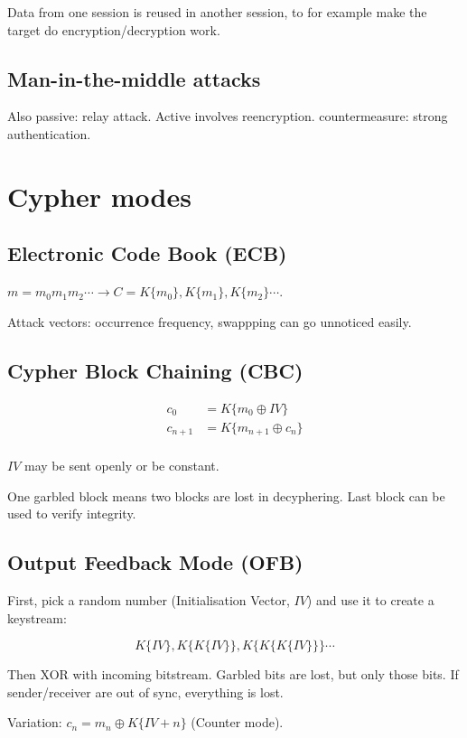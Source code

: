 \documentclass{article}
\begin{document}
Data from one session is reused in another session, to for example make the
target do encryption/decryption work.

\subsection{Man-in-the-middle attacks}

Also passive: relay attack. Active involves reencryption. countermeasure:
strong authentication.

\section{Cypher modes}

\subsection{Electronic Code Book (ECB)}
$m = m_0m_1m_2\cdots \rightarrow C = K\{m_0\},K\{m_1\},K\{m_2\}\cdots$.

Attack vectors: occurrence frequency, swappping can go unnoticed easily.

\subsection{Cypher Block Chaining (CBC)}

\begin{align*}
  c_0     &= K\{m_0 \oplus IV\} \\
  c_{n+1} &= K\{m_{n+1} \oplus c_n\} \\
\end{align*}

$IV$ may be sent openly or be constant.

One garbled block means two blocks are lost in decyphering. Last block
can be used to verify integrity.

\subsection{Output Feedback Mode (OFB)}

First, pick a random number (Initialisation Vector, $IV$) and use it to
create a keystream:

\[ K\{IV\},K\{K\{IV\}\}, K\{K\{K\{IV\}\}\} \cdots \]

Then XOR with incoming bitstream. Garbled bits are lost, but only those bits.
If sender/receiver are out of sync, everything is lost.

Variation: $c_n = m_n \oplus K\{IV + n\}$ (Counter mode).
\end{document}
